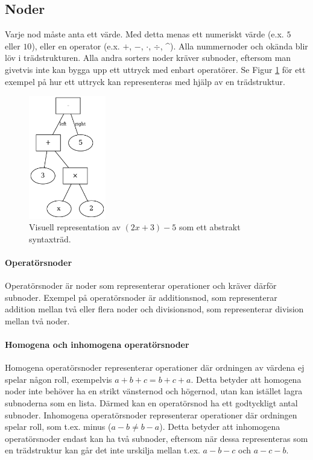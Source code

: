 \documentclass[12pt,a4paper]{article}
\begin{document}
\subsection{Noder}
\label{subsubsec:noder}
Varje nod måste anta ett värde. Med detta menas ett numeriskt värde (e.x. \(5\) eller \(10\)), eller en operator (e.x. \(+\), \(-\), \(\cdot\), \(\div\), \string^). Alla nummernoder och okända blir löv i trädstrukturen. Alla andra sorters noder kräver subnoder, eftersom man givetvis inte kan bygga upp ett uttryck med enbart operatörer. Se Figur \ref{fig:2131} för ett exempel på hur ett uttryck kan representeras med hjälp av en trädstruktur.
\begin{figure}[H]
	\centering
	\includegraphics[width=0.3\textwidth]{image24}
	\caption{Visuell representation av \((2x + 3) - 5\) som ett abstrakt syntaxträd.}
	\label{fig:2131}
\end{figure}
\paragraph{Operatörsnoder}
Operatörsnoder är noder som representerar operationer och kräver därför subnoder. Exempel på operatörsnoder är additionsnod, som representerar addition mellan två eller flera noder och divisionsnod, som representerar division mellan två noder.
\paragraph{Homogena och inhomogena operatörsnoder}
\label{subsec:operator}
Homogena operatörsnoder representerar operationer där ordningen av värdena ej spelar någon roll, exempelvis \(a + b + c = b + c + a\). Detta betyder att homogena noder inte behöver ha en strikt vänsternod och högernod, utan kan istället lagra subnoderna som en lista. Därmed kan en operatörsnod ha ett godtyckligt antal subnoder. Inhomogena operatörsnoder representerar operationer där ordningen spelar roll, som t.ex. minus (\(a - b \neq b - a\)). Detta betyder att inhomogena operatörsnoder endast kan ha två subnoder, eftersom när dessa representeras som en trädstruktur kan går det inte urskilja mellan t.ex. \(a - b - c\) och \(a - c - b\).
\end{document}
